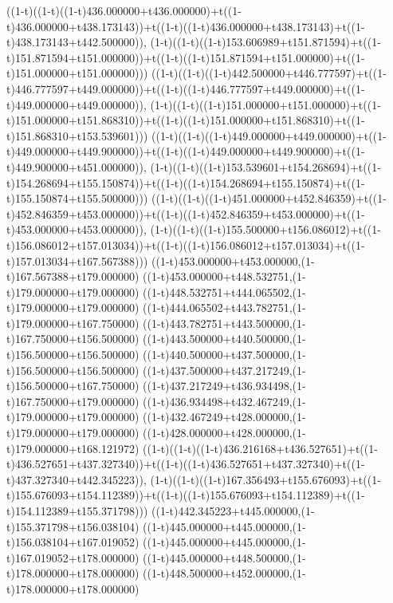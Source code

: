 ((1-t)((1-t)((1-t)436.000000+t436.000000)+t((1-t)436.000000+t438.173143))+t((1-t)((1-t)436.000000+t438.173143)+t((1-t)438.173143+t442.500000)),                                     (1-t)((1-t)((1-t)153.606989+t151.871594)+t((1-t)151.871594+t151.000000))+t((1-t)((1-t)151.871594+t151.000000)+t((1-t)151.000000+t151.000000)))
((1-t)((1-t)((1-t)442.500000+t446.777597)+t((1-t)446.777597+t449.000000))+t((1-t)((1-t)446.777597+t449.000000)+t((1-t)449.000000+t449.000000)),                                     (1-t)((1-t)((1-t)151.000000+t151.000000)+t((1-t)151.000000+t151.868310))+t((1-t)((1-t)151.000000+t151.868310)+t((1-t)151.868310+t153.539601)))
((1-t)((1-t)((1-t)449.000000+t449.000000)+t((1-t)449.000000+t449.900000))+t((1-t)((1-t)449.000000+t449.900000)+t((1-t)449.900000+t451.000000)),                                     (1-t)((1-t)((1-t)153.539601+t154.268694)+t((1-t)154.268694+t155.150874))+t((1-t)((1-t)154.268694+t155.150874)+t((1-t)155.150874+t155.500000)))
((1-t)((1-t)((1-t)451.000000+t452.846359)+t((1-t)452.846359+t453.000000))+t((1-t)((1-t)452.846359+t453.000000)+t((1-t)453.000000+t453.000000)),                                     (1-t)((1-t)((1-t)155.500000+t156.086012)+t((1-t)156.086012+t157.013034))+t((1-t)((1-t)156.086012+t157.013034)+t((1-t)157.013034+t167.567388)))
((1-t)453.000000+t453.000000,(1-t)167.567388+t179.000000)
((1-t)453.000000+t448.532751,(1-t)179.000000+t179.000000)
((1-t)448.532751+t444.065502,(1-t)179.000000+t179.000000)
((1-t)444.065502+t443.782751,(1-t)179.000000+t167.750000)
((1-t)443.782751+t443.500000,(1-t)167.750000+t156.500000)
((1-t)443.500000+t440.500000,(1-t)156.500000+t156.500000)
((1-t)440.500000+t437.500000,(1-t)156.500000+t156.500000)
((1-t)437.500000+t437.217249,(1-t)156.500000+t167.750000)
((1-t)437.217249+t436.934498,(1-t)167.750000+t179.000000)
((1-t)436.934498+t432.467249,(1-t)179.000000+t179.000000)
((1-t)432.467249+t428.000000,(1-t)179.000000+t179.000000)
((1-t)428.000000+t428.000000,(1-t)179.000000+t168.121972)
((1-t)((1-t)((1-t)436.216168+t436.527651)+t((1-t)436.527651+t437.327340))+t((1-t)((1-t)436.527651+t437.327340)+t((1-t)437.327340+t442.345223)),                                     (1-t)((1-t)((1-t)167.356493+t155.676093)+t((1-t)155.676093+t154.112389))+t((1-t)((1-t)155.676093+t154.112389)+t((1-t)154.112389+t155.371798)))
((1-t)442.345223+t445.000000,(1-t)155.371798+t156.038104)
((1-t)445.000000+t445.000000,(1-t)156.038104+t167.019052)
((1-t)445.000000+t445.000000,(1-t)167.019052+t178.000000)
((1-t)445.000000+t448.500000,(1-t)178.000000+t178.000000)
((1-t)448.500000+t452.000000,(1-t)178.000000+t178.000000)
